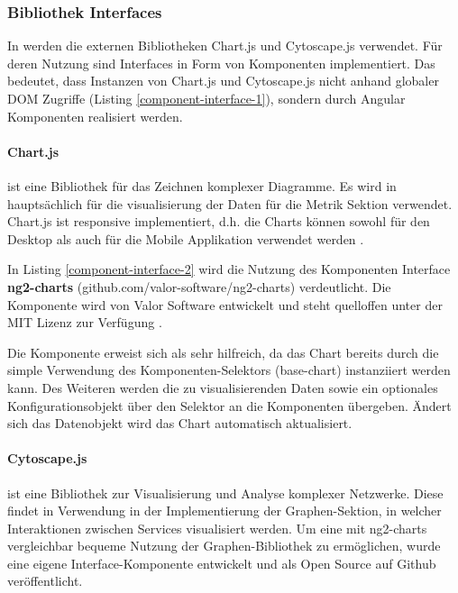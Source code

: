 \subsubsection{Bibliothek Interfaces}

In \projectname werden die externen Bibliotheken Chart.js und Cytoscape.js verwendet.
Für deren Nutzung sind Interfaces in Form von Komponenten implementiert.
Das bedeutet, dass Instanzen von Chart.js und Cytoscape.js nicht anhand globaler \ac{DOM} Zugriffe (Listing \ref{component-interface-1}),
sondern durch Angular Komponenten realisiert werden.

\newpage
\paragraph{Chart.js}
ist eine Bibliothek für das Zeichnen komplexer Diagramme.
Es wird in \projectname{} hauptsächlich für die visualisierung der Daten für die Metrik Sektion verwendet.
Chart.js ist responsive implementiert, d.h. die Charts können sowohl für den Desktop
als auch für die Mobile Applikation verwendet werden \cite{Chart80:online}.

\vspace{0.3cm}



\vspace{0.3cm}
In Listing \ref{component-interface-2} wird die Nutzung des Komponenten Interface \textbf{ng2-charts} (github.com/valor-software/ng2-charts) verdeutlicht.
Die Komponente wird von Valor Software entwickelt und steht quelloffen unter der MIT Lizenz zur Verfügung \cite{valor6:online}.

Die Komponente erweist sich als sehr hilfreich, da das Chart bereits durch die simple Verwendung des Komponenten-Selektors (base-chart) instanziiert werden kann.
Des Weiteren werden die zu visualisierenden Daten sowie ein optionales Konfigurationsobjekt über den Selektor an die Komponenten übergeben.
Ändert sich das Datenobjekt wird das Chart automatisch aktualisiert.


\newpage
\paragraph{Cytoscape.js}
ist eine Bibliothek zur Visualisierung und Analyse komplexer Netzwerke.
Diese findet in \projectname{} Verwendung in der Implementierung der Graphen-Sektion,
in welcher Interaktionen zwischen Services visualisiert werden.
Um eine mit ng2-charts vergleichbar bequeme Nutzung der Graphen-Bibliothek zu ermöglichen,
wurde eine eigene Interface-Komponente entwickelt und als Open Source auf Github veröffentlicht.

